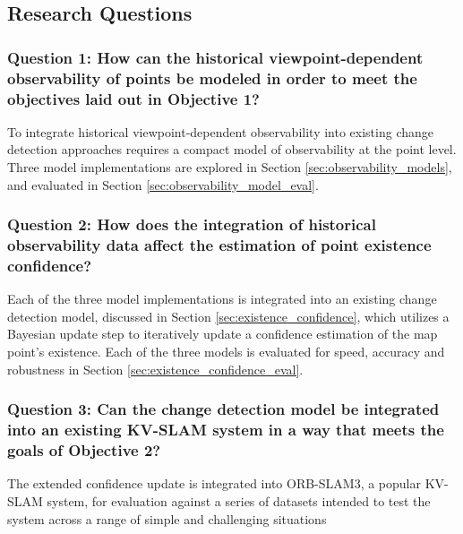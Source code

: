 \subsection{Research Questions}

\subsubsection*{Question 1: How can the historical viewpoint-dependent observability of points be modeled in order to meet the objectives laid out in Objective 1?}

To integrate historical viewpoint-dependent observability into existing change detection approaches requires a compact model of observability at the point level. Three model implementations are explored in Section \ref{sec:observability_models}, and evaluated in Section \ref{sec:observability_model_eval}.

\subsubsection*{Question 2: How does the integration of historical observability data affect the estimation of point existence confidence?}

Each of the three model implementations is integrated into an existing change detection model, discussed in Section \ref{sec:existence_confidence}, which utilizes a Bayesian update step to iteratively update a confidence estimation of the map point's existence. Each of the three models is evaluated for speed, accuracy and robustness in Section \ref{sec:existence_confidence_eval}.

\subsubsection*{Question 3: Can the change detection model be integrated into an existing KV-SLAM system in a way that meets the goals of Objective 2?}

The extended confidence update is integrated into ORB-SLAM3, a popular KV-SLAM system, for evaluation against a series of datasets intended to test the system across a range of simple and challenging situations